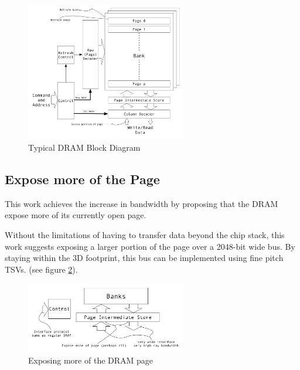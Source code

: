 \documentclass[journal]{IEEEtran}
\begin{document}
\begin{figure}[!t]
\centering
\captionsetup{justification=centering}
\centerline{
\mbox{\includegraphics[width=2.75in]{DRAMBlockDiagram.jpg}}
}
\center\caption{Typical DRAM Block Diagram}
\label{fig:dramBlockDiagram}
\end{figure}

\subsection{Expose more of the Page}
\label{sec:exposeMorePage}

This work achieves the increase in bandwidth by proposing that the DRAM expose more of its currently open page.

Without the limitations of having to transfer data beyond the chip stack, this work suggests exposing a larger portion of the page over a 2048-bit wide bus. By staying within the 3D footprint, this bus can be implemented using fine pitch TSVs.
(see figure \ref{fig:dramBusChange}).

\begin{figure}[!t]
\centering
\captionsetup{justification=centering}
\captionsetup{width=.9\linewidth}
\centerline{
\mbox{\includegraphics[width=2.75in]{DRAMBusChange.jpg}}
}
\center\caption{Exposing more of the DRAM page}
\label{fig:dramBusChange}
\end{figure}
\end{document}
